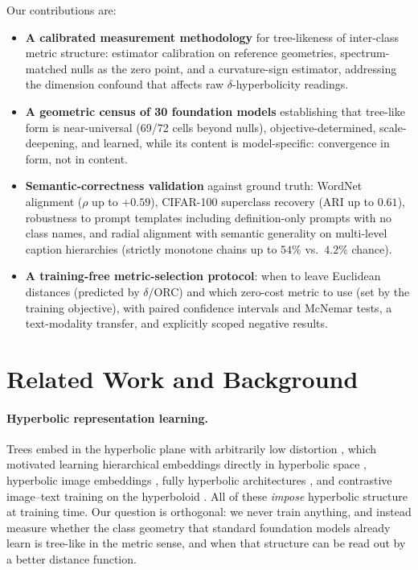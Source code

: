 \documentclass{article} %
\begin{document}
Our contributions are:
\begin{itemize}
\item \textbf{A calibrated measurement methodology} for tree-likeness of inter-class metric structure: estimator calibration on reference geometries, spectrum-matched nulls as the zero point, and a curvature-sign estimator, addressing the dimension confound that affects raw $\delta$-hyperbolicity readings.
\item \textbf{A geometric census of 30 foundation models} establishing that tree-like form is near-universal (69/72 cells beyond nulls), objective-determined, scale-deepening, and learned, while its content is model-specific: convergence in form, not in content.
\item \textbf{Semantic-correctness validation} against ground truth: WordNet alignment ($\rho$ up to $+0.59$), CIFAR-100 superclass recovery (ARI up to $0.61$), robustness to prompt templates including definition-only prompts with no class names, and radial alignment with semantic generality on multi-level caption hierarchies (strictly monotone chains up to $54\%$ vs.\ $4.2\%$ chance). %
\item \textbf{A training-free metric-selection protocol}: when to leave Euclidean distances (predicted by $\delta$/ORC) and which zero-cost metric to use (set by the training objective), with paired confidence intervals and McNemar tests, a text-modality transfer, and explicitly scoped negative results.
\end{itemize}

\section{Related Work and Background}
\label{sec:related}

\paragraph{Hyperbolic representation learning.} Trees embed in the hyperbolic plane with arbitrarily low distortion \citep{sarkar2011low}, which motivated learning hierarchical embeddings directly in hyperbolic space \citep{nickel2017poincare}, hyperbolic image embeddings \citep{Khrulkov_2020_CVPR}, fully hyperbolic architectures \citep{chen2022fully}, and contrastive image--text training on the hyperboloid \citep{desai2023meru}. All of these \emph{impose} hyperbolic structure at training time. Our question is orthogonal: we never train anything, and instead measure whether the class geometry that standard foundation models already learn is tree-like in the metric sense, and when that structure can be read out by a better distance function.
\end{document}
